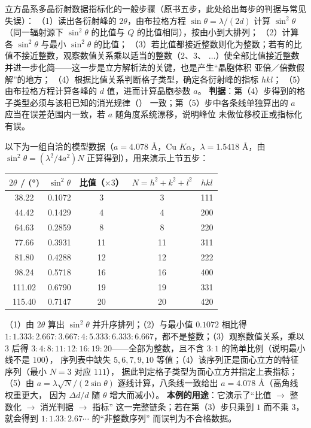 \begin{keycond}
立方晶系多晶衍射数据指标化的一般步骤（原书五步，此处给出每步的判据与常见失误）：
（1）读出各衍射峰的 $2\theta$，由布拉格方程 $\sin\theta=\lambda/(2d)$ 计算 $\sin^{2}\theta$
（同一辐射源下 $\sin^{2}\theta$ 的比值与 $Q$ 的比值相同），按由小到大排列；
（2）计算各 $\sin^{2}\theta$ 与最小 $\sin^{2}\theta$ 的比值；
（3）若比值都接近整数则化为整数；若有的比值不接近整数，观察数值关系乘以适当的整数（$2$、$3$、
$\dots$）使全部比值接近整数并进一步化简——这一步是立方解析法的关键，也是产生“晶胞体积
亚倍／倍数假解”的地方；
（4）根据比值关系判断格子类型，确定各衍射峰的指标 $hkl$；
（5）由布拉格方程计算各峰的 $d$ 值，进而计算晶胞参数 $a$。
\textbf{判据}：第（4）步得到的格子类型必须与该相已知的消光规律（）
一致；第（5）步中各条线单独算出的 $a$ 应当在误差范围内一致，若 $a$ 随角度系统漂移，说明峰位
未做位移校正或指标化有误。
\end{keycond}

\begin{example}
以下为一组自洽的模型数据（$a=4.078$ Å，Cu $K\alpha$，$\lambda=1.5418$ Å，由
$\sin^{2}\theta=(\lambda^{2}/4a^{2})N$ 正算得到），用来演示上节五步：
\begin{center}
\begin{tabular}{@{}ccccc@{}}
  \toprule
  $2\theta$ / (°) & $\sin^{2}\theta$ & 比值（$\times3$） & $N=h^{2}+k^{2}+l^{2}$ & $hkl$ \\
  \midrule
  38.22 & 0.1072 & 3 & 3 & 111 \\
  44.42 & 0.1429 & 4 & 4 & 200 \\
  64.63 & 0.2859 & 8 & 8 & 220 \\
  77.66 & 0.3931 & 11 & 11 & 311 \\
  81.80 & 0.4288 & 12 & 12 & 222 \\
  98.24 & 0.5718 & 16 & 16 & 400 \\
  111.02 & 0.6790 & 19 & 19 & 331 \\
  115.40 & 0.7147 & 20 & 20 & 420 \\
  \bottomrule
\end{tabular}
\end{center}
\vspace{0.3em}
（1）由 $2\theta$ 算出 $\sin^{2}\theta$ 并升序排列；（2）与最小值 $0.1072$ 相比得
$1:1.333:2.667:3.667:4:5.333:6.333:6.667$，都不是整数；（3）观察数值关系，乘以 $3$ 后得
$3:4:8:11:12:16:19:20$——全部为整数，且不含 $3:1$ 的简单比例（说明最小线不是 $100$），
序列表中缺失 $5,6,7,9,10$ 等值；（4）该序列正是面心立方的特征序列（最小 $N=3$ 对应 $111$），
据此判定格子类型为面心立方并指定上表指标；（5）由
$a=\lambda\sqrt{N}/(2\sin\theta)$ 逐线计算，八条线一致给出 $a=4.078$ Å（高角线权重更大，
因为 $\Delta d/d$ 随 $\theta$ 增大而减小）。
\textbf{本例的用途}：它演示了“比值 $\rightarrow$ 整数化 $\rightarrow$ 消光判据 $\rightarrow$ 指标”
这一完整链条；若在第（3）步只乘到 $1$ 而不乘 $3$，就会得到 $1:1.33:2.67\cdots$ 的“非整数序列”
而误判为不合格数据。
\end{example}


